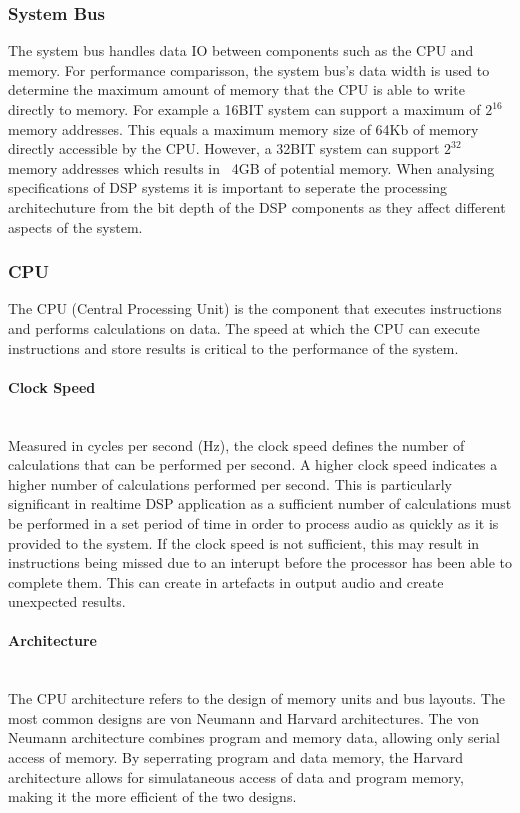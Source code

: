 \documentclass{scrartcl}
\begin{document}
    \subsubsection{System Bus}
    The system bus handles data IO between components such as the CPU
    and memory. For performance comparisson, the system bus's data width is
    used to determine the maximum amount of memory that the CPU is able to
    write directly to memory. 
    For example a 16BIT system can support a maximum of $2^{16}$ memory
    addresses. This equals a maximum memory size of 64Kb of memory directly
    accessible by the CPU. However, a 32BIT system can support $2^{32}$ memory
    addresses which results in ~4GB of potential memory.
    When analysing specifications of DSP systems it is important to seperate
    the processing architechuture from the bit depth of the DSP components as
    they affect different aspects of the system.


    \subsubsection{CPU}\label{CPU}
    The CPU (Central Processing Unit) is the component that executes
    instructions and performs calculations on data. The speed at which the CPU
    can execute instructions and store results is critical to the performance
    of the system.

    \paragraph{Clock Speed}~\\
    Measured in cycles per second (Hz), the clock speed defines the number of
    calculations that can be performed per second. A higher clock speed
    indicates a higher number of calculations performed per second. This is
    particularly significant in realtime DSP application as a sufficient number
    of calculations must be performed in a set period of time in order to
    process audio as quickly as it is provided to the system.  If the clock
    speed is not sufficient, this may result in instructions being missed due
    to an interupt before the processor has been able to complete them. This
    can create in artefacts in output audio and create unexpected results.

    \paragraph{Architecture}~\\
    The CPU architecture refers to the design of memory units and bus layouts.
    The most common designs are von Neumann and Harvard architectures. The von
    Neumann architecture combines program and memory data, allowing only serial
    access of memory. By seperrating program and data memory, the Harvard
    architecture allows for simulataneous access of data and program memory,
    making it the more efficient of the two designs.
    
\end{document}
